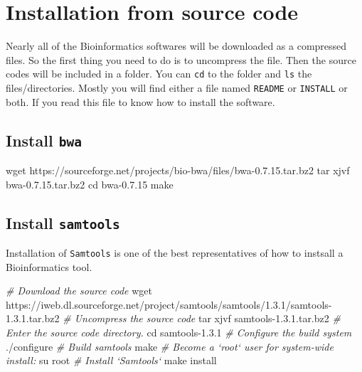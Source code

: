 \documentclass[]{book}
\makeatletter
\newenvironment{Shaded}{\begin{snugshade}}{\end{snugshade}}
\newcommand{\BuiltInTok}[1]{#1}
\newcommand{\CommentTok}[1]{\textcolor[rgb]{0.56,0.35,0.01}{\textit{#1}}}
\newcommand{\ExtensionTok}[1]{#1}
\newcommand{\FunctionTok}[1]{\textcolor[rgb]{0.00,0.00,0.00}{#1}}
\newcommand{\NormalTok}[1]{#1}
\newenvironment{kframe}{%
\medskip{}
\setlength{\fboxsep}{.8em}
 \def\at@end@of@kframe{}%
 \ifinner\ifhmode%
  \def\at@end@of@kframe{\end{minipage}}%
  \begin{minipage}{\columnwidth}%
 \fi\fi%
 \def\FrameCommand##1{\hskip\@totalleftmargin \hskip-\fboxsep
 \colorbox{shadecolor}{##1}\hskip-\fboxsep
     \hskip-\linewidth \hskip-\@totalleftmargin \hskip\columnwidth}%
 \MakeFramed {\advance\hsize-\width
   \@totalleftmargin\z@ \linewidth\hsize
   \@setminipage}}%
 {\par\unskip\endMakeFramed%
 \at@end@of@kframe}
\renewenvironment{Shaded}{\begin{kframe}}{\end{kframe}}
\makeatother
\begin{document}
\hypertarget{installation-from-source-code}{%
\section{Installation from source code}\label{installation-from-source-code}}

Nearly all of the Bioinformatics softwares will be downloaded as a compressed files. So the first thing you need to do is to uncompress the file. Then the source codes will be included in a folder. You can \texttt{cd} to the folder and \texttt{ls} the files/directories. Mostly you will find either a file named \texttt{README} or \texttt{INSTALL} or both. If you read this file to know how to install the software.

\hypertarget{install-bwa}{%
\subsection{\texorpdfstring{Install \texttt{bwa}}{Install bwa}}\label{install-bwa}}

\begin{Shaded}
\begin{Highlighting}[]
\FunctionTok{wget}\NormalTok{ https://sourceforge.net/projects/bio-bwa/files/bwa-0.7.15.tar.bz2}
\FunctionTok{tar}\NormalTok{ xjvf bwa-0.7.15.tar.bz2}
\BuiltInTok{cd}\NormalTok{ bwa-0.7.15}
\FunctionTok{make}
\end{Highlighting}
\end{Shaded}

\hypertarget{install-samtools}{%
\subsection{\texorpdfstring{Install \texttt{samtools}}{Install samtools}}\label{install-samtools}}

Installation of \texttt{Samtools} is one of the best representatives of how to instsall a Bioinformatics tool.

\begin{Shaded}
\begin{Highlighting}[]
\CommentTok{# Download the source code}
\FunctionTok{wget}\NormalTok{ https://iweb.dl.sourceforge.net/project/samtools/samtools/1.3.1/samtools-1.3.1.tar.bz2}
\CommentTok{# Uncompress the source code}
\FunctionTok{tar}\NormalTok{ xjvf samtools-1.3.1.tar.bz2}
\CommentTok{# Enter the source code directory.}
\BuiltInTok{cd}\NormalTok{ samtools-1.3.1}
\CommentTok{# Configure the build system}
\ExtensionTok{./configure}
\CommentTok{# Build samtools}
\FunctionTok{make}
\CommentTok{# Become a `root` user for system-wide install:}
\FunctionTok{su}\NormalTok{ root}
\CommentTok{# Install `Samtools`}
\FunctionTok{make}\NormalTok{ install}
\end{Highlighting}
\end{Shaded}
\end{document}
